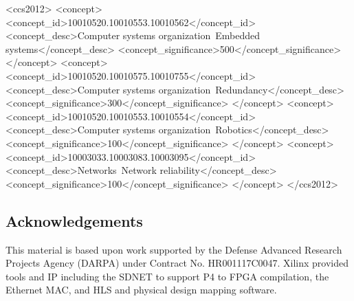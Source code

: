 \documentclass[sigconf]{acmart}
\newcommand{\FIXME}[1]{{\color{red}{\textbf{FIXME:} #1}}}
\begin{document}
%
%
\begin{CCSXML}
<ccs2012>
 <concept>
  <concept_id>10010520.10010553.10010562</concept_id>
  <concept_desc>Computer systems organization~Embedded systems</concept_desc>
  <concept_significance>500</concept_significance>
 </concept>
 <concept>
  <concept_id>10010520.10010575.10010755</concept_id>
  <concept_desc>Computer systems organization~Redundancy</concept_desc>
  <concept_significance>300</concept_significance>
 </concept>
 <concept>
  <concept_id>10010520.10010553.10010554</concept_id>
  <concept_desc>Computer systems organization~Robotics</concept_desc>
  <concept_significance>100</concept_significance>
 </concept>
 <concept>
  <concept_id>10003033.10003083.10003095</concept_id>
  <concept_desc>Networks~Network reliability</concept_desc>
  <concept_significance>100</concept_significance>
 </concept>
</ccs2012>  
\end{CCSXML}





\maketitle








\subsection*{Acknowledgements}
\FIXME{Vencore for FEC.}
This material is based upon work supported by the Defense Advanced
Research Projects Agency (DARPA) under Contract No. HR001117C0047.
Xilinx provided tools and IP including the SDNET to support P4 to FPGA
compilation, the Ethernet MAC, and HLS and physical design mapping
software. 



\end{document}
